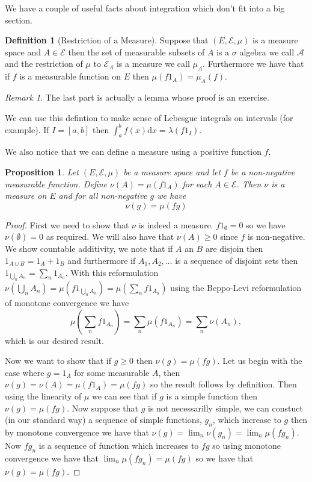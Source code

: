 \documentclass[11pt]{article}
\newtheorem{prp}[thm]{Proposition}
\theoremstyle{definition}
\newtheorem{dfn}[thm]{Definition}
\theoremstyle{remark}
\newtheorem{remark}[thm]{Remark}
\begin{document}
We have a couple of useful facts about integration which don't fit into a big section.

\begin{dfn}[Restriction of a Measure]
Suppose that $(E, \mathcal{E}, \mu)$ is a measure space and $A \in \mathcal{E}$ then the set of measurable subsets of $A$ is a $\sigma$ algebra we call $\mathcal{A}$ and the restriction of $\mu$ to $\mathcal{E}_A$ is a measure we call $\mu_A$. Furthermore we have that if $f$ is a measurable function on $E$ then $\mu(f1_A) = \mu_A(f)$.
\end{dfn}
\begin{remark}
The last part is actually a lemma whose proof is an exercise.
\end{remark}

We can use this defintion to make sense of Lebesgue integrals on intervals (for example). If $I= [a,b]$ then $\int_a^b f(x) \mathrm{d}x = \lambda(f1_I)$. 

We also notice that we can define a measure using a positive function $f$. 

\begin{prp}
Let $(E, \mathcal{E}, \mu)$ be a measure space and let $f$ be a non-negative measurable function. Define $\nu(A) = \mu(f1_A)$ for each $A \in \mathcal{E}$. Then $\nu$ is a measure on $E$ and for all non-negative $g$ we have
\[ \nu(g) = \mu(fg) \]
\end{prp}
\begin{proof}
First we need to show that $\nu$ is indeed a measure. $f1_\emptyset = 0$ so we have $\nu(\emptyset) = 0$ as required. We will also have that $\nu(A) \geq 0$ since $f$ is non-negative. We show countable additivity, we note that if $A$ an $B$ are disjoin then $1_{A \cup B} = 1_A + 1_B$ and furthermore if $A_1, A_2, \dots $ is a sequence of disjoint sets then $1_{\bigcup_n A_n} = \sum_n 1_{A_n}$. With this reformulation $\nu(\bigcup_n A_n) = \mu( f1_{\bigcup_n A_n}) = \mu ( \sum_n f1_{A_n})$ using the Beppo-Levi reformulation of monotone convergence we have
\[ \mu(\sum_n f1_{A_n} ) = \sum_n \mu(f1_{A_n}) = \sum_n \nu(A_n), \] which is our desired result. 

Now we want to show that if $g \geq 0$ then $\nu(g) = \mu(fg)$. Let us begin with the case where $g=1_A$ for some measurable $A$, then $\nu(g) = \nu(A) = \mu(f1_A) = \mu(fg)$ so the result follows by definition. Then using the linearity of $\mu$ we can see that if $g$ is a simple function then $\nu(g) = \mu(fg)$. Now suppose that $g$ is not necessarilly simple, we can constuct (in our standard way) a sequence of simple functions, $g_n$, which increase to $g$ then by monotone convergence we have that $\nu(g) = \lim_n \nu(g_n) = \lim_n \mu(f g_n)$. Now $fg_n$ is a sequence of function which increases to $fg$ so using monotone convergence we have that $\lim_n \mu(f g_n) = \mu(fg)$ so we have that $\nu(g) = \mu(fg)$.
\end{proof}
\end{document}
